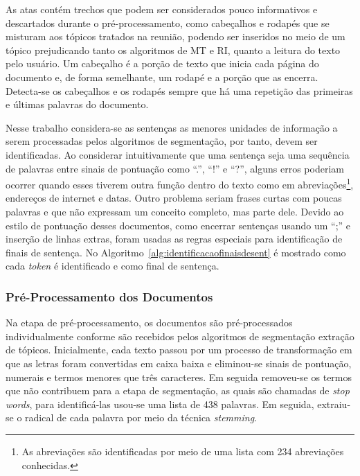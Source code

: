 

As atas contém trechos que podem ser considerados pouco informativos e descartados durante o pré-processamento, como cabeçalhos e rodapés que se misturam aos tópicos tratados na reunião, podendo ser inseridos no meio de um tópico prejudicando tanto os algoritmos de MT e RI, quanto a leitura do texto pelo usuário. Um cabeçalho é a porção de texto que inicia cada página do documento e, de forma semelhante, um rodapé e a porção que as encerra. Detecta-se os cabeçalhos e os rodapés sempre que há uma repetição das primeiras e últimas palavras do documento.


Nesse trabalho considera-se as sentenças as menores unidades de informação a serem processadas pelos algoritmos de segmentação, por tanto, devem ser identificadas. Ao considerar intuitivamente que uma sentença seja uma sequência de palavras entre sinais de pontuação como ``.'', ``!'' e ``?'', alguns erros poderiam ocorrer quando esses tiverem outra função dentro do texto como em abreviações\footnote{As abreviações são identificadas por meio de uma lista com 234 abreviações conhecidas.}, endereços de internet e datas. Outro problema seriam frases curtas com poucas palavras e que não expressam um conceito completo, mas parte dele. Devido ao estilo de pontuação desses documentos, como encerrar sentenças usando um ``;'' e inserção de linhas extras, foram usadas as regras especiais para identificação de finais de sentença. No Algoritmo~\ref{alg:identificacaofinaisdesent} é mostrado como cada \textit{token} é identificado e como final de sentença.  %







\subsubsection{Pré-Processamento dos Documentos}


Na etapa de pré-processamento, os documentos são pré-processados individualmente conforme são recebidos pelos algoritmos de segmentação extração de tópicos. Inicialmente, cada texto passou por um processo de transformação em que as letras foram convertidas em caixa baixa e eliminou-se sinais de pontuação, numerais e termos menores que três caracteres. Em seguida removeu-se os termos que não contribuem para a etapa de segmentação, as quais são chamadas de \textit{stop words}, para identificá-las usou-se uma lista de 438 palavras. Em seguida, extraiu-se o radical de cada palavra por meio da técnica \textit{stemming}. 

